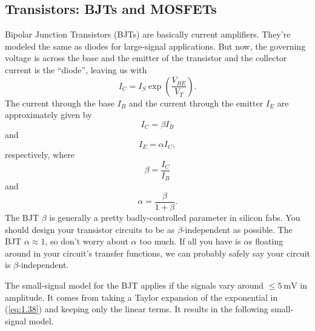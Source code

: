 \subsection{Transistors: BJTs and MOSFETs}
Bipolar Junction Transistors (BJTs) are basically current amplifiers. They're modeled the same as diodes for large-signal applications. But now, the governing voltage is across the base and the emitter of the transistor and the collector current is the ``diode'', leaving us with
\begin{equation}
\label{eq:1.38}
I_{C} = I_{S} \exp \left( \frac{V_{BE}}{V_{T}} \right).
\end{equation}
The current through the base $I_{B}$ and the current through the emitter $I_{E}$ are approximately given by
\begin{equation}
  \label{eq:1.39}
  I_{C} = \beta I_{B}
\end{equation}
and
\begin{equation}
  \label{eq:1.40}
  I_{E} = \alpha I_{C},
\end{equation}
respectively, where
\begin{equation}
\label{eq:1.41}
\beta = \frac{I_{C}}{I_{B}}
\end{equation}
and
\begin{equation}
\label{eq:1.42}
\alpha = \frac{ \beta }{ 1 + \beta }.
\end{equation}
The BJT $\beta$ is generally a pretty badly-controlled parameter in silicon fabs. You should design your transistor circuits to be as $\beta$-independent as possible. The BJT $\alpha \approx 1$, so don't worry about $\alpha$ too much. If all you have is $\alpha$s floating around in your circuit's transfer functions, we can probably safely say your circuit is $\beta$-independent.

The small-signal model for the BJT applies if the signals vary around $\leq \SI{5}{\mV}$ in amplitude. It comes from taking a Taylor expansion of the exponential in (\cref{eq:1.38}) and keeping only the linear terms. It results in the following small-signal model. 


